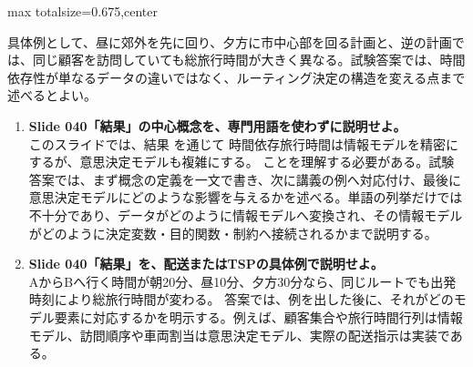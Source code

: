 \begin{adjustbox}{max totalsize={\textwidth}{0.675\textheight},center}
\begin{minipage}{\textwidth}
\begin{minipage}[t]{0.485\textwidth}
具体例として、昼に郊外を先に回り、夕方に市中心部を回る計画と、逆の計画では、同じ顧客を訪問していても総旅行時間が大きく異なる。試験答案では、時間依存性が単なるデータの違いではなく、ルーティング決定の構造を変える点まで述べるとよい。\par
{}
\begin{enumerate}
\item \textbf{Slide 040「結果」の中心概念を、専門用語を使わずに説明せよ。}\\このスライドでは、結果 を通じて 時間依存旅行時間は情報モデルを精密にするが、意思決定モデルも複雑にする。 ことを理解する必要がある。試験答案では、まず概念の定義を一文で書き、次に講義の例へ対応付け、最後に意思決定モデルにどのような影響を与えるかを述べる。単語の列挙だけでは不十分であり、データがどのように情報モデルへ変換され、その情報モデルがどのように決定変数・目的関数・制約へ接続されるかまで説明する。
\item \textbf{Slide 040「結果」を、配送またはTSPの具体例で説明せよ。}\\AからBへ行く時間が朝20分、昼10分、夕方30分なら、同じルートでも出発時刻により総旅行時間が変わる。 答案では、例を出した後に、それがどのモデル要素に対応するかを明示する。例えば、顧客集合や旅行時間行列は情報モデル、訪問順序や車両割当は意思決定モデル、実際の配送指示は実装である。
\end{enumerate}
\end{minipage}
\end{minipage}
\end{adjustbox}

